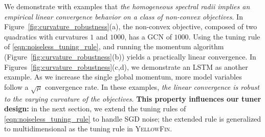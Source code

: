 \documentclass{article} %
\newcommand{\tuner}{\textsc{YellowFin}\xspace}
\begin{document}
We demonstrate with examples that \emph{the homogeneous spectral radii implies an empirical linear convergence behavior on a class of non-convex objectives}. In Figure~\ref{fig:curvature_robustness}(a), the non-convex objective,
composed of two quadratics with curvatures $1$ and $1000$, has a GCN of $1000$.
Using the tuning rule of \eqref{eqn:noiseless_tuning_rule}, and running the momentum algorithm (Figure~\ref{fig:curvature_robustness}(b)) yields a practically linear convergence.
In Figures~\ref{fig:curvature_robustness}(c,d), we demonstrate an LSTM as another example. As we increase the single global momentum, more model variables follow a $\sqrt{\mu}$ convergence rate.
In these examples, \emph{the linear convergence is robust to the varying curvature of the objectives}. \textbf{This property influences our tuner design:}
{in the next section, we extend the tuning rules of \eqref{eqn:noiseless_tuning_rule} to handle SGD noise; 
the extended rule is generalized to multidimensional as the tuning rule in \tuner}.
\end{document}
